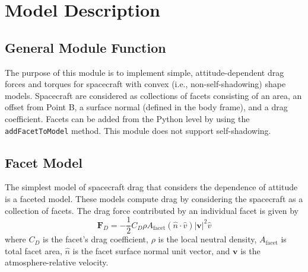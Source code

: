 
\section{Model Description}
\subsection{General Module Function}
The purpose of this module is to implement simple, attitude-dependent drag forces and torques for spacecraft with convex (i.e., non-self-shadowing) shape models. Spacecraft are considered as collections of facets consisting of an area, an offset from Point B, a surface normal (defined in the body frame), and a drag coefficient. Facets can be added from the Python level by using the \verb|addFacetToModel| method. This module does not support self-shadowing.
\subsection{Facet Model}
The simplest model of spacecraft drag that considers the dependence of attitude is a faceted model. These models compute drag by considering the spacecraft as a collection of facets. The drag force contributed by an individual facet is given by
\begin{equation}
\label{eq:expAtmo}
\mathbf{ F}_D = -\frac{1}{2} C_D \rho A_{\text{facet}} (\hat{n} \cdot \hat{v}) |\mathbf{v}|^2 \hat{v}
\end{equation}
where $C_D$ is the facet's drag coefficient, $\rho$ is the local neutral density, $A_{\text{facet}}$ is total facet area, $\hat{n}$ is the facet surface normal unit vector, and $\mathbf{v}$ is the atmosphere-relative velocity.
